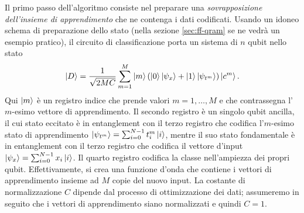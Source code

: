

Il primo passo dell'algoritmo consiste nel preparare una 
\emph{sovrapposizione dell'insieme di apprendimento} che 
ne contenga i dati codificati. 
Usando un idoneo schema di preparazione dello stato (nella sezione \ref{sec:ff-qram} 
se ne vedrà un esempio pratico), 
il circuito di classificazione porta un sistema di $n$ 
qubit nello stato 
\begin{equation}
    \ket{D} = \frac{1}{\sqrt{2MC}} \sum_{m=1}^M \ket{m} 
    \left( \ket{0}\ket{\psi_x} + \ket{1}\ket{\psi_{t^m}} \right)
    \ket{c^m}.
\end{equation}
Qui $\ket{m}$ è un registro indice che prende valori 
$m=1,\ldots,M$ e che contrassegna l'$m$-esimo vettore 
di apprendimento. 
Il secondo registro è un singolo qubit ancilla, il cui 
stato eccitato è in entanglement con il terzo registro 
che codifica l'$m$-esimo stato di apprendimento 
$\ket{\psi_{t^m}} = \sum_{i=0}^{N-1} t_i^m \ket{i}$, 
mentre il suo stato fondamentale è in entanglement con 
il terzo registro che codifica il vettore d'input 
$\ket{\psi_x} = \sum_{i=0}^{N-1} x_i \ket{i}$. 
Il quarto registro codifica la classe nell'ampiezza dei propri qubit. 
Effettivamente, si crea una funzione d'onda che contiene 
i vettori di apprendimento insieme ad $M$ copie del nuovo 
input. La costante di normalizzazione $C$ dipende dal 
processo di ottimizzazione dei dati; 
assumeremo in seguito che i vettori di apprendimento siano 
normalizzati e quindi $C=1$. 

